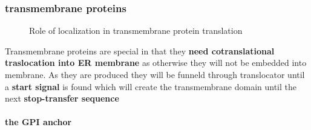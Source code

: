 \documentclass[../main.tex]{subfiles}
\begin{document}
\subsubsection{transmembrane proteins}
\begin{figure}[H]
    \centering
    \hspace{0.05\textwidth} %
    \caption{Role of localization in transmembrane protein translation}
    \label{fig:ITC_all}
\end{figure}
Transmembrane proteins are special in that they \textbf{need cotranslational traslocation into ER membrane} as otherwise they will not be embedded into membrane. As they are produced they will be funneld through translocator until a \textbf{start signal }is found which will create the transmembrane domain until the next \textbf{stop-transfer sequence }

\paragraph{the GPI anchor}
\end{document}
